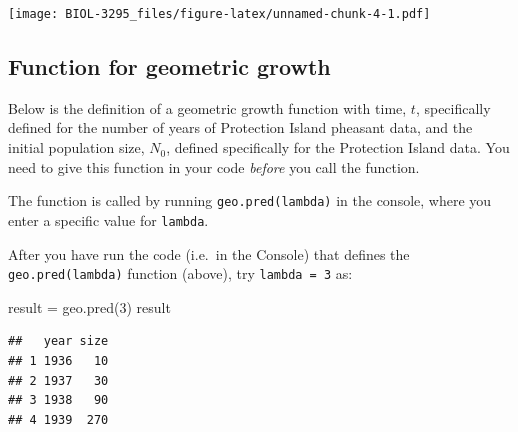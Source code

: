 \documentclass[
]{book}
\newenvironment{Shaded}{\begin{snugshade}}{\end{snugshade}}
\newcommand{\AttributeTok}[1]{\textcolor[rgb]{0.77,0.63,0.00}{#1}}
\newcommand{\ControlFlowTok}[1]{\textcolor[rgb]{0.13,0.29,0.53}{\textbf{#1}}}
\newcommand{\DecValTok}[1]{\textcolor[rgb]{0.00,0.00,0.81}{#1}}
\newcommand{\FunctionTok}[1]{\textcolor[rgb]{0.00,0.00,0.00}{#1}}
\newcommand{\NormalTok}[1]{#1}
\newcommand{\OtherTok}[1]{\textcolor[rgb]{0.56,0.35,0.01}{#1}}
\newcommand{\SpecialCharTok}[1]{\textcolor[rgb]{0.00,0.00,0.00}{#1}}
\begin{document}
\texttt{[image: BIOL-3295\_files/figure-latex/unnamed-chunk-4-1.pdf]}

\hypertarget{function-for-geometric-growth}{%
\subsection{Function for geometric growth}\label{function-for-geometric-growth}}

Below is the definition of a geometric growth function with time, \(t\), specifically defined for the number of years of Protection Island pheasant data, and the initial population size, \(N_0\), defined specifically for the Protection Island data. You need to give this function in your code \emph{before} you call the function.

\begin{Shaded}
\end{Shaded}

The function is called by running \texttt{geo.pred(lambda)} in the console, where you enter a specific value for \texttt{lambda}.

After you have run the code (i.e.~in the Console) that defines the \texttt{geo.pred(lambda)} function (above), try \texttt{lambda\ =\ 3} as:

\begin{Shaded}
\begin{Highlighting}[]
\NormalTok{result }\OtherTok{=} \FunctionTok{geo.pred}\NormalTok{(}\DecValTok{3}\NormalTok{)}
\NormalTok{result}
\end{Highlighting}
\end{Shaded}

\begin{verbatim}
##   year size
## 1 1936   10
## 2 1937   30
## 3 1938   90
## 4 1939  270
\end{verbatim}
\end{document}
